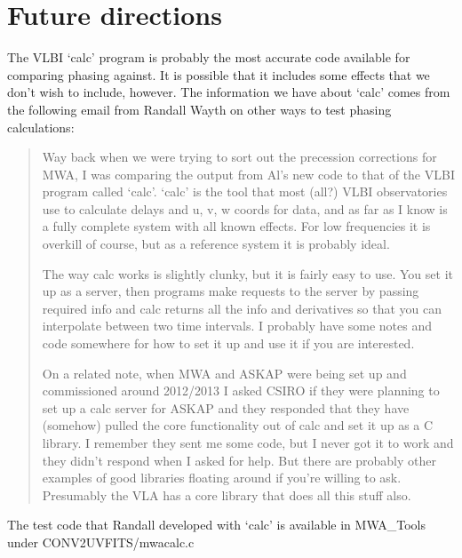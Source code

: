 \documentclass[11pt, oneside]{article}   	%
\begin{document}
\section{Future directions}
The VLBI `calc' program is probably the most accurate code available for comparing phasing against. It is possible that it  includes some effects that we don't wish to include, however. The information we have about `calc' comes from the following email from Randall Wayth on other ways to test phasing calculations:
\begin{quotation}
Way back when we were trying to sort out the precession corrections for MWA, I was comparing the output from Al's new code to that of the VLBI program called `calc'. `calc' is the tool that most (all?) VLBI observatories use to calculate delays and u, v, w coords for data, and as far as I know is a fully complete system with all known effects. For low frequencies it is overkill of course, but as a reference system it is probably ideal.

The way calc works is slightly clunky, but it is fairly easy to use. You set it up as a server, then programs make requests to the server by passing required info and calc returns all the info and derivatives so that you can interpolate between two time intervals. I probably have some notes and code somewhere for how to set it up and use it if you are interested.

On a related note, when MWA and ASKAP were being set up and commissioned around 2012/2013 I asked CSIRO if they were planning to set up a calc server for ASKAP and they responded that they have (somehow) pulled the core functionality out of calc and set it up as a C library. I remember they sent me some code, but I never got it to work and they didn't respond when I asked for help. But there are probably other examples of good libraries floating around if you're willing to ask. Presumably the VLA has a core library that does all this stuff also.
\end{quotation}

The test code that Randall developed with `calc' is available in MWA\_Tools under CONV2UVFITS/mwacalc.c
\end{document}

